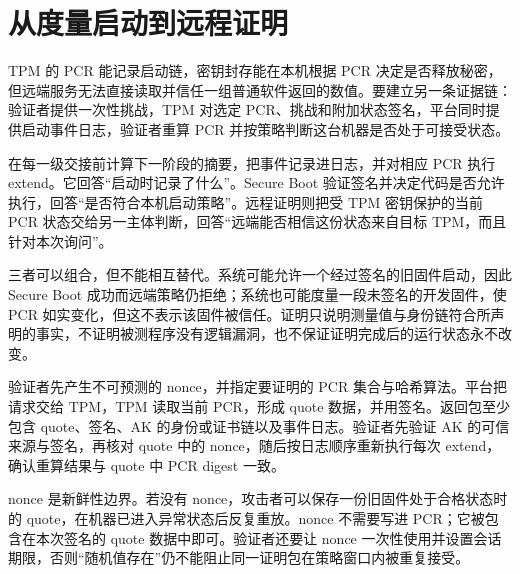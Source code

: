 \section{从度量启动到远程证明}

TPM 的 PCR 能记录启动链，密钥封存能在本机根据 PCR 决定是否释放秘密，但远端服务无法直接读取并信任一组普通软件返回的数值。要建立另一条证据链：验证者提供一次性挑战，TPM 对选定 PCR、挑战和附加状态签名，平台同时提供启动事件日志，验证者重算 PCR 并按策略判断这台机器是否处于可接受状态。\cite{tpm20-architecture}


在每一级交接前计算下一阶段的摘要，把事件记录进日志，并对相应 PCR 执行 extend。它回答“启动时记录了什么”。Secure Boot 验证签名并决定代码是否允许执行，回答“是否符合本机启动策略”。远程证明则把受 TPM 密钥保护的当前 PCR 状态交给另一主体判断，回答“远端能否相信这份状态来自目标 TPM，而且针对本次询问”。

三者可以组合，但不能相互替代。系统可能允许一个经过签名的旧固件启动，因此 Secure Boot 成功而远端策略仍拒绝；系统也可能度量一段未签名的开发固件，使 PCR 如实变化，但这不表示该固件被信任。证明只说明测量值与身份链符合所声明的事实，不证明被测程序没有逻辑漏洞，也不保证证明完成后的运行状态永不改变。


验证者先产生不可预测的 nonce，并指定要证明的 PCR 集合与哈希算法。平台把请求交给 TPM，TPM 读取当前 PCR，形成 quote 数据，并用签名。返回包至少包含 quote、签名、AK 的身份或证书链以及事件日志。验证者先验证 AK 的可信来源与签名，再核对 quote 中的 nonce，随后按日志顺序重新执行每次 extend，确认重算结果与 quote 中 PCR digest 一致。

nonce 是新鲜性边界。若没有 nonce，攻击者可以保存一份旧固件处于合格状态时的 quote，在机器已进入异常状态后反复重放。nonce 不需要写进 PCR；它被包含在本次签名的 quote 数据中即可。验证者还要让 nonce 一次性使用并设置会话期限，否则“随机值存在”仍不能阻止同一证明包在策略窗口内被重复接受。

